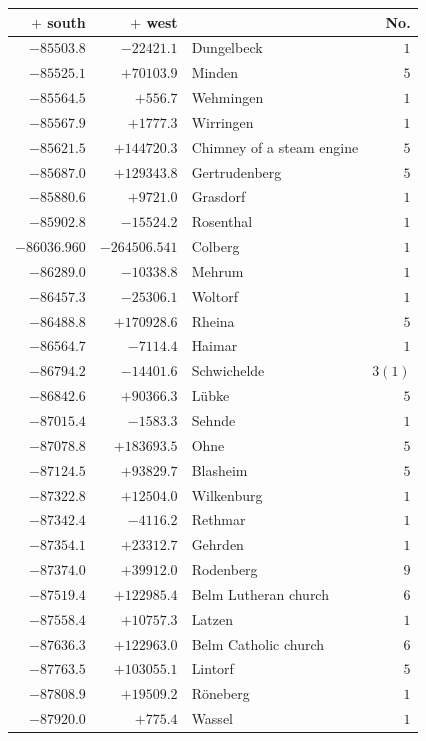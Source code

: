 \begin{center}\begingroup\fontsize{8}{9}\selectfont
\setlength{\tabcolsep}{4pt}
\begin{tabular}{r|r|p{170pt}|r}\hline
\(+\) south&\(+\) west&&No.\\\hline
\(-85503.8\)&\(-22421.1\)&Dungelbeck&\(1\)\\
\(-85525.1\)&\(+70103.9\)&Minden&\(5\)\\
\(-85564.5\)&\(+556.7\)&Wehmingen&\(1\)\\
\(-85567.9\)&\(+1777.3\)&Wirringen&\(1\)\\
\(-85621.5\)&\(+144720.3\)&Chimney of a steam engine&\(5\)\\
\(-85687.0\)&\(+129343.8\)&Gertrudenberg&\(5\)\\
\(-85880.6\)&\(+9721.0\)&Grasdorf&\(1\)\\
\(-85902.8\)&\(-15524.2\)&Rosenthal&\(1\)\\
\(-86036.960\)&\(-264506.541\)&Colberg&\(1\)\\
\(-86289.0\)&\(-10338.8\)&Mehrum&\(1\)\\
\(-86457.3\)&\(-25306.1\)&Woltorf&\(1\)\\
\(-86488.8\)&\(+170928.6\)&Rheina&\(5\)\\
\(-86564.7\)&\(-7114.4\)&Haimar&\(1\)\\
\(-86794.2\)&\(-14401.6\)&Schwichelde&\(3 (1)\)\\
\(-86842.6\)&\(+90366.3\)&Lübke&\(5\)\\
\(-87015.4\)&\(-1583.3\)&Sehnde&\(1\)\\
\(-87078.8\)&\(+183693.5\)&Ohne&\(5\)\\
\(-87124.5\)&\(+93829.7\)&Blasheim&\(5\)\\
\(-87322.8\)&\(+12504.0\)&Wilkenburg&\(1\)\\
\(-87342.4\)&\(-4116.2\)&Rethmar&\(1\)\\
\(-87354.1\)&\(+23312.7\)&Gehrden&\(1\)\\
\(-87374.0\)&\(+39912.0\)&Rodenberg&\(9\)\\
\(-87519.4\)&\(+122985.4\)&Belm Lutheran church&\(6\)\\
\(-87558.4\)&\(+10757.3\)&Latzen&\(1\)\\
\(-87636.3\)&\(+122963.0\)&Belm Catholic church&\(6\)\\
\(-87763.5\)&\(+103055.1\)&Lintorf&\(5\)\\
\(-87808.9\)&\(+19509.2\)&Röneberg&\(1\)\\
\(-87920.0\)&\(+775.4\)&Wassel&\(1\)\\

\end{tabular}
\end{center}
